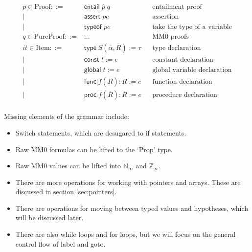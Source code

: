 \documentclass[acmsmall,nonacm]{acmart}
\newcommand*{\N}{\mathbb{N}}
\newcommand*{\Z}{\mathbb{Z}}
\begin{document}
\begin{align*}
  p \in \mathrm{Proof} ::={}&\mathsf{entail}\;\overline{p}\;q&&\mbox{entailment proof}\\
    \mid{}&\mathsf{assert}\;pe&&\mbox{assertion}\\
    \mid{}&\mathsf{typeof}\;pe&&\mbox{take the type of a variable}\\
  q \in \mathrm{PureProof} ::={}&\dots&&\mbox{MM0 proofs}\\
  it \in \mathrm{Item} ::={}&\mathsf{type}\;S(\overline{\alpha}, \overline{R}):=\tau&&\mbox{type declaration}\\
    \mid{}&\mathsf{const}\;t:=e&&\mbox{constant declaration}\\
    \mid{}&\mathsf{global}\;t:=e&&\mbox{global variable declaration}\\
    \mid{}&\mathsf{func}\;f(\overline{R}):\overline{R}:=e&&\mbox{function declaration}\\
    \mid{}&\mathsf{proc}\;f(\overline{R}):\overline{R}:=e&&\mbox{procedure declaration}\\
\end{align*}

Missing elements of the grammar include:
\begin{itemize}
  \item Switch statements, which are desugared to if statements.
  \item Raw MM0 formulas can be lifted to the `Prop' type.
  \item Raw MM0 values can be lifted into $\N_\infty$ and $\Z_\infty$.
  \item There are more operations for working with pointers and arrays. These are discussed in section \ref{sec:pointers}.
  \item There are operations for moving between typed values and hypotheses, which will be discussed later.
  \item There are also \textsf{while} loops and \textsf{for} loops, but we will focus on the general control flow of \textsf{label} and \textsf{goto}.
\end{itemize}
\end{document}
